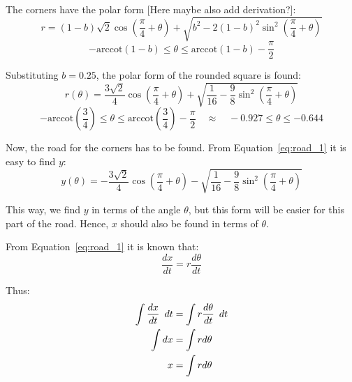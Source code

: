 \documentclass[12pt]{article}
\newcommand{\Hquad}{\hspace{0.5em}}
\begin{document}
        The corners have the polar form\cite{bridge_wolfram} [Here maybe also add derivation?]:
        \begin{equation}
            r = (1-b)\sqrt{2} \cos (\frac{\pi}{4} + \theta) + \sqrt{b^2 - 2(1-b)^2 \sin^2 (\frac{\pi}{4}+\theta)}
        \end{equation}
        \[- \text{arccot}(1-b) \leq \theta \leq \text{arccot}(1-b) - \frac{\pi}{2}\]

        Substituting $b=0.25$, the polar form of the rounded square is found:
        \begin{equation}
            r(\theta) = \frac{3\sqrt{2}}{4} \cos (\frac{\pi}{4} + \theta) + \sqrt{\frac{1}{16} - \frac{9}{8} \sin^2 (\frac{\pi}{4}+\theta)}
        \end{equation}
        \[- \text{arccot}(\frac{3}{4}) \leq \theta \leq \text{arccot}(\frac{3}{4}) - \frac{\pi}{2} \quad \approx \quad -0.927 \leq \theta \leq -0.644\]

        Now, the road for the corners has to be found. From Equation~\ref{eq:road_1} it is easy to find $y$:
        \begin{equation}
            y(\theta) = - \frac{3\sqrt{2}}{4} \cos (\frac{\pi}{4} + \theta) - \sqrt{\frac{1}{16} - \frac{9}{8} \sin^2 (\frac{\pi}{4}+\theta)}
        \end{equation}

        This way, we find $y$ in terms of the angle $\theta$, but this form will be easier for this part of the road. Hence, $x$ should also be found in terms of $\theta$.


        From Equation~\ref{eq:road_1} it is known that:
        \begin{equation}
            \frac{dx}{dt} = r \frac{d\theta}{dt}
        \end{equation}

        Thus:
        \begin{align}
            \int \frac{dx}{dt} \Hquad dt &= \int r \frac{d\theta}{dt} \Hquad dt \\
            \int dx &= \int r d\theta \\
            x &= \int r d\theta
        \end{align}
\end{document}
